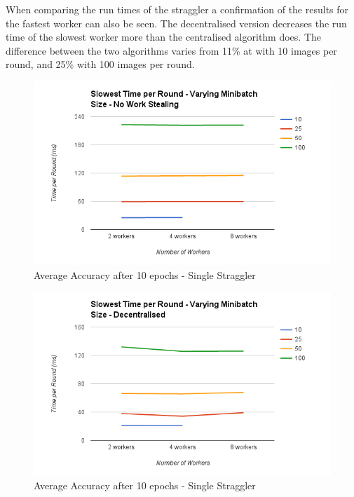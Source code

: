 \documentclass[12pt]{article}
\begin{document}
When comparing the run times of the straggler a confirmation of the results for the fastest worker can also be seen. The decentralised version decreases the run time of the slowest worker more than the centralised algorithm does. The difference between the two algorithms varies from 11\% at with 10 images per round, and 25\% with 100 images per round.

\begin{figure}[H]
  \centering
  \includegraphics[width=6in]{SlowestMinibatchNo}
  \caption[]{Average Accuracy after 10 epochs - Single Straggler}
  \label{SlowestMinibatchNo}
\end{figure}

\begin{figure}[H]
  \centering
  \includegraphics[width=6in]{SlowestMinibatchDecentralised}
  \caption[]{Average Accuracy after 10 epochs - Single Straggler}
  \label{SlowestMinibatchDecentralised}
\end{figure}
\end{document}
